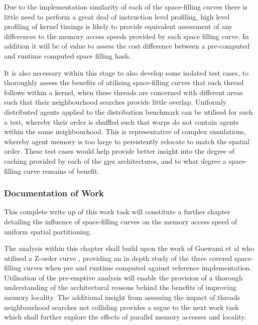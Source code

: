         Due to the implementation similarity of each of the space-filling curves there is little need to perform a great deal of instruction level profiling, high level profiling of kernel timings is likely to provide equivalent assessment of any differences to the memory access speeds provided by each space filling curve. In addition it will be of value to assess the cost difference between a pre-computed and runtime computed space filling hash.
        
        It is also necessary within this stage to also develop some isolated test cases, to thoroughly assess the benefits of utilising space-filling curves that each thread follows within a kernel, when these threads are concerned with different areas such that their neighbourhood searches provide little overlap. Uniformly distributed agents applied to the distribution benchmark can be utilised for such a test, whereby their order is shuffled such that warps do not contain agents within the same neighbourhood. This is representative of complex simulations, whereby agent memory is too large to persistently relocate to match the spatial order. These test cases would help provide better insight into the degree of caching provided by each of the \gls{gpu} architectures, and to what degree a space-filling curve remains of benefit.
        
      \subsubsection*{Documentation of Work}
        This complete write up of this work task will constitute a further chapter detailing the influence of space-filling curves on the memory access speed of uniform spatial partitioning. 
        
        The analysis within this chapter shall build upon the work of Goswami et al who utilised a Z-order curve \cite{GS*10}, providing an in depth study of the three covered space-filling curves when pre and runtime computed against reference implementation. Utilisation of the pre-emptive analysis will enable the provision of a thorough understanding of the architectural reasons behind the benefits of improving memory locality. The additional insight from assessing the impact of threads neighbourhood searches not colliding provides a segue to the next work task which shall further explore the effects of parallel memory accesses and locality.
      
